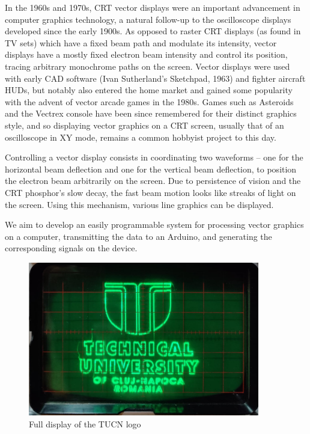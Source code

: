 \documentclass[12pt]{article}
\begin{document}
In the 1960s and 1970s, CRT vector displays were an important advancement in computer graphics technology, a natural follow-up to the oscilloscope displays developed since the early 1900s. As opposed to raster CRT displays (as found in TV sets) which have a fixed beam path and modulate its intensity, vector displays have a mostly fixed electron beam intensity and control its position, tracing arbitrary monochrome paths on the screen. Vector displays were used with early CAD software (Ivan Sutherland's Sketchpad, 1963) and fighter aircraft HUDs, but notably also entered the home market and gained some popularity with the advent of vector arcade games in the 1980s. Games such as Asteroids and the Vectrex console have been since remembered for their distinct graphics style, and so displaying vector graphics on a CRT screen, usually that of an oscilloscope in XY mode, remains a common hobbyist project to this day.

Controlling a vector display consists in coordinating two waveforms -- one for the horizontal beam deflection and one for the vertical beam deflection, to position the electron beam arbitrarily on the screen. Due to persistence of vision and the CRT phosphor's slow decay, the fast beam motion looks like streaks of light on the screen. Using this mechanism, various line graphics can be displayed.

We aim to develop an easily programmable system for processing vector graphics on a computer, transmitting the data to an Arduino, and generating the corresponding signals on the device. 

\newpage
\begin{figure}[h]
\centering
\includegraphics[width=0.9\textwidth]{images/demo-tucn.png}
\caption{Full display of the TUCN logo}
\end{figure}
\vspace{-1em} %
\end{document}

